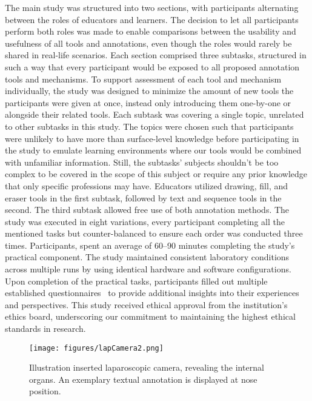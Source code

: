 The main study was structured into two sections, with participants alternating between the roles of educators and learners. The decision to let all participants perform both roles was made to enable comparisons between the usability and usefulness of all tools and annotations, even though the roles would rarely be shared in real-life scenarios. Each section comprised three subtasks, structured in such a way that every participant would be exposed to all proposed annotation tools and mechanisms. To support assessment of each tool and mechanism individually, the study was designed to minimize the amount of new tools the participants were given at once, instead only introducing them one-by-one or alongside their related tools. 
%
Each subtask was covering a single topic, unrelated to other subtasks in this study. The topics were chosen such that participants were unlikely to have more than surface-level knowledge before participating in the study to emulate learning environments where our tools would be combined with unfamiliar information. Still, the subtasks' subjects shouldn't be too complex to be covered in the scope of this subject or require any prior knowledge that only specific professions may have.
%
Educators utilized drawing, fill, and eraser tools in the first subtask, followed by text and sequence tools in the second. The third subtask allowed free use of both annotation methods. The study was executed in eight variations, every participant completing all the mentioned tasks but counter-balanced to ensure each order was conducted three times. Participants, spent an average of 60–90 minutes completing the study's practical component. The study maintained consistent laboratory conditions across multiple runs by using identical hardware and software configurations. Upon completion of the practical tasks, participants filled out multiple established questionnaires~\cite{ssqOriginal, ipq, sus, daq} to provide additional insights into their experiences and perspectives. This study received ethical approval from the institution's ethics board, underscoring our commitment to maintaining the highest ethical standards in research.

\begin{figure}[tb]
 \centering
 \texttt{[image: figures/lapCamera2.png]}
 \caption{Illustration inserted laparoscopic camera, revealing the internal organs. An exemplary textual annotation is displayed at nose position.}
 \label{fig:lapcamera}
\end{figure}

